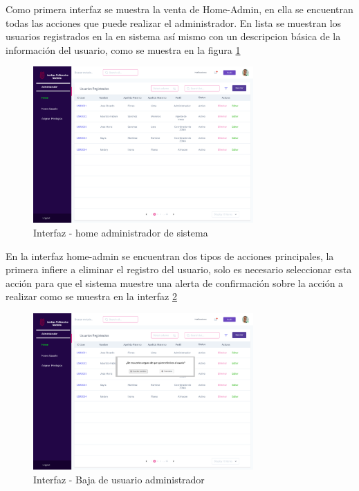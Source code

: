 Como primera interfaz se muestra la venta de Home-Admin, en ella se encuentran todas las acciones que puede realizar el administrador. En  lista se muestran los usuarios registrados en la en sistema así mismo con un descripcion básica de la información del usuario, como se muestra en la figura \ref{fig:INFHOMADMIN}
\begin{figure}[H]
	\centering
	\includegraphics[width=0.75\textwidth]{Capitulo4/Img/GestionUser/Home-admin}
	\caption{Interfaz - home  administrador de sistema}
	\label{fig:INFHOMADMIN}
\end{figure}

En la interfaz home-admin se encuentran dos tipos de acciones principales, la primera infiere a eliminar el registro del usuario, solo es necesario seleccionar esta acción para que el sistema muestre una alerta de confirmación sobre la acción a realizar como se muestra en la interfaz \ref{fig:ELIMIAD}


\begin{figure}[H]
	\centering
	\includegraphics[width=0.75\textwidth]{Capitulo4/Img/GestionUser/Eliminar}
	\caption{Interfaz - Baja de usuario administrador }
	\label{fig:ELIMIAD}
\end{figure}


